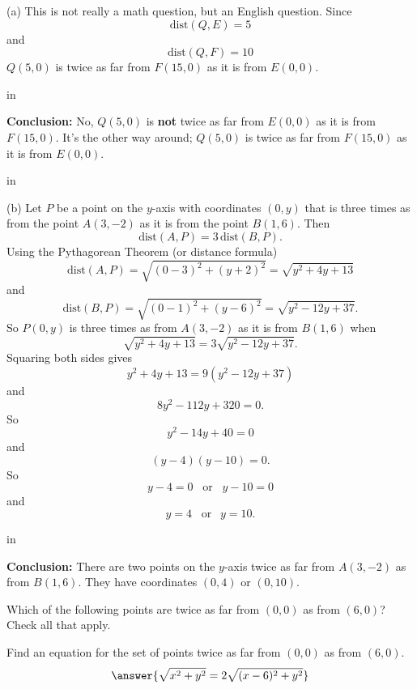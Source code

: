 \documentclass{ximera}
\newcommand{\pskip}{\vskip 0.1 in}
\begin{document}
\begin{explanation}
(a) This is not really a math question, but an English question. Since
\[
    \text{dist}(Q,E) = 5
\]
and 
\[
    \text{dist}(Q,F) = 10  %
\]
$Q(5,0)$ is twice as far from $F(15,0)$ as it is from $E(0,0)$.

\pskip

{\bf Conclusion:} No, $Q(5,0)$ is {\bf not} twice as far from $E(0,0)$ as it is from $F(15,0)$. It's the other way around; $Q(5,0)$ is twice as far from $F(15,0)$ as it is from $E(0,0)$. 

\pskip

(b) Let $P$ be a point on the $y$-axis with coordinates $(0,y)$ that is three times as  from the point $A(3,-2)$ as it is from the point $B(1,6)$. Then
\[
    \text{dist}(A,P) = 3 \, \text{dist}(B,P) .
\]
Using the Pythagorean Theorem (or distance formula)
\[
    \text{dist}(A,P) = \sqrt{(0-3)^2 + (y+2)^2} = \sqrt{y^2 + 4y + 13}
\]
and
\[
    \text{dist}(B,P) = \sqrt{(0-1)^2 + (y-6)^2} = \sqrt{y^2-12y+37}.
\]
So $P(0,y)$ is  three times as  from $A(3,-2)$ as it is from $B(1,6)$ when
\[
   \sqrt{y^2 + 4y + 13} = 3 \sqrt{y^2-12y+37} .
\]
Squaring both sides gives
\[
  y^2 + 4y + 13 = 9(y^2-12y+37)
\]
and 
\[
        8y^2 - 112y +320 = 0 .
\]
So
\[
     y^2 - 14y + 40 = 0
\]
and
\[
     (y -4 )(y - 10) = 0.
\]
So
\[
     y-4 = 0    \;\;\;  \text{or} \;\;\; y-10=0
\]
and
\[
    y=4  \;\; \; \text{or} \;\;\ y=10 .
\]

\pskip

{\bf Conclusion:} There are two points on the $y$-axis twice as far from $A(3,-2)$ as from $B(1,6)$. They have coordinates $(0,4)$ or $(0,10)$.

\end{explanation}


\begin{exercise}  
  Which of the following points are twice as far from $(0,0)$ as from $(6,0)$? Check all that apply.  
  \begin{selectAll}  
     \end{selectAll}  
\end{exercise}  



\begin{question} 
Find an equation for the set of points twice as far from $(0,0)$ as from $(6,0)$. 
\[
  \answer{\sqrt{x^2+y^2} = 2 \sqrt{(x-6)^2+y^2}} 
\]
    \end{question}
\end{document}
